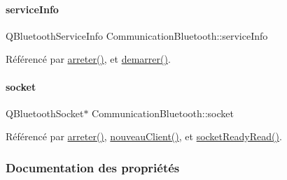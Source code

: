 \mbox{\label{class_communication_bluetooth_a5ee2e50a8558ebb27b72a97343dabbf3}} 
\paragraph{\texorpdfstring{service\+Info}{serviceInfo}}
{\footnotesize\ttfamily Q\+Bluetooth\+Service\+Info Communication\+Bluetooth\+::service\+Info\hspace{0.3cm}{\ttfamily [private]}}



Référencé par \hyperlink{class_communication_bluetooth_ac87aa0a33a650b981786979468d34324}{arreter()}, et \hyperlink{class_communication_bluetooth_a056f2cb0ff59757e027a430e356e22bc}{demarrer()}.

\mbox{\label{class_communication_bluetooth_aa07c388515488b3d38d37f1518bfd9d2}} 
\paragraph{\texorpdfstring{socket}{socket}}
{\footnotesize\ttfamily Q\+Bluetooth\+Socket$\ast$ Communication\+Bluetooth\+::socket\hspace{0.3cm}{\ttfamily [private]}}



Référencé par \hyperlink{class_communication_bluetooth_ac87aa0a33a650b981786979468d34324}{arreter()}, \hyperlink{class_communication_bluetooth_ab88c9bb8a1bd2c68e3d14fc3615be888}{nouveau\+Client()}, et \hyperlink{class_communication_bluetooth_a28b131a307d4a799f4f8d7b6969fa9ca}{socket\+Ready\+Read()}.



\subsubsection{Documentation des propriétés}
\mbox{\label{class_communication_bluetooth_a972265a71842606740b53560a7fc0e53}} 
